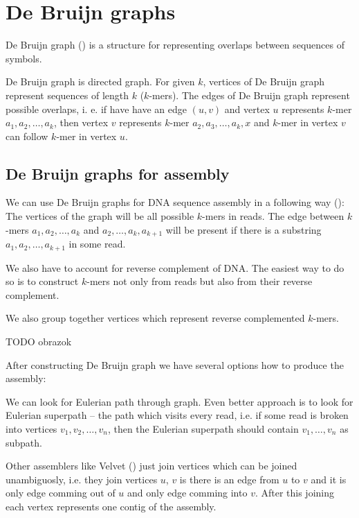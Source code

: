 \chapter{De Bruijn graphs}

De Bruijn graph (\cite{de1946combinatorial}) is a structure for representing
overlaps between sequences of symbols.

De Bruijn graph is directed graph. 
For given $k$, vertices of De Bruijn graph represent sequences of length $k$
($k$-mers). The edges of De Bruijn graph represent possible overlaps, i. e. 
if have have an edge $(u, v)$ and vertex $u$ represents $k$-mer $a_1, a_2, \dots, a_k$, then
vertex $v$ represents $k$-mer $a_2, a_3, \dots, a_k, x$ and $k$-mer in vertex $v$ can
follow $k$-mer in vertex $u$.

\section{De Bruijn graphs for assembly}

We can use De Bruijn graphs for DNA sequence assembly in a following way
(\cite{pevzner2001eulerian}):
The vertices of the graph will be all possible $k$-mers in reads. 
The edge between $k$-mers $a_1, a_2, \dots, a_k$ and $a_2, \dots, a_k, a_{k+1}$
will be present if there is a substring $a_1, a_2, \dots, a_{k+1}$ in some read.

We also have to account for reverse complement of DNA. The easiest way to do so
is to construct $k$-mers not only from reads but also from their reverse complement.

We also group together vertices which represent reverse complemented $k$-mers.

TODO obrazok

After constructing De Bruijn graph we have several options how to produce the assembly:

We can look for Eulerian path through graph. Even better approach is to look for
Eulerian superpath -- the path which visits every read, i.e. if some read
is broken into vertices $v_1, v_2, \dots, v_n$, then the Eulerian superpath
should contain $v_1, \dots, v_n$ as subpath.

Other assemblers like Velvet (\cite{Velvet}) just join vertices which can be joined
unambiguosly, i.e. they join vertices $u$, $v$ is there is an edge from $u$ to $v$ and
it is only edge comming out of $u$ and only edge comming into $v$. After this joining
each vertex represents one contig of the assembly.

